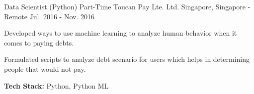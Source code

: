 \begin{cventries}
    \cventry
        {Data Scientist (Python) Part-Time}
        {Toucan Pay Lte. Ltd.}
        {Singapore, Singapore - Remote}
        {Jul. 2016 - Nov. 2016}
        {
            \begin{cvitems}
                \item 
                    {Developed ways to use machine learning to analyze human behavior when it comes to paying debts.}
                \item
                    {Formulated scripts to analyze debt scenario for users which helps in determining people that would not pay.}
                \item                        
                    {\textbf{Tech Stack:} Python, Python ML}
            \end{cvitems}
        }
        

\end{cventries}
